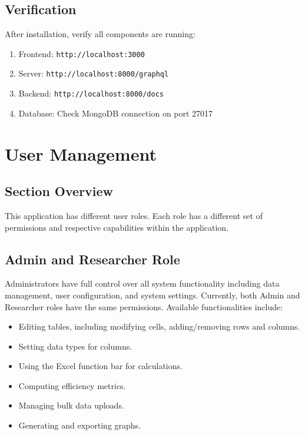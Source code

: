 \documentclass[12pt]{article}
\begin{document}
\subsection{Verification}
After installation, verify all components are running:
\begin{enumerate}
    \item Frontend: \texttt{http://localhost:3000}
    \item Server: \texttt{http://localhost:8000/graphql}
    \item Backend: \texttt{http://localhost:8000/docs}
    \item Database: Check MongoDB connection on port 27017
\end{enumerate}

\section{User Management}
\subsection*{Section Overview}
This application has different user roles. Each role has a different set of
permissions and respective capabilities within the application.

\subsection{Admin and Researcher Role}
Administrators have full control over all system functionality including data
management, user configuration, and system settings. Currently, both Admin and
Researcher roles have the same permissions. \newline \newline
Available functionalities include:
\begin{itemize}
    \item Editing tables, including modifying cells, adding/removing rows and columns.
    \item Setting data types for columns.
    \item Using the Excel function bar for calculations.
    \item Computing efficiency metrics.
    \item Managing bulk data uploads.
    \item Generating and exporting graphs.
\end{itemize}
\end{document}
